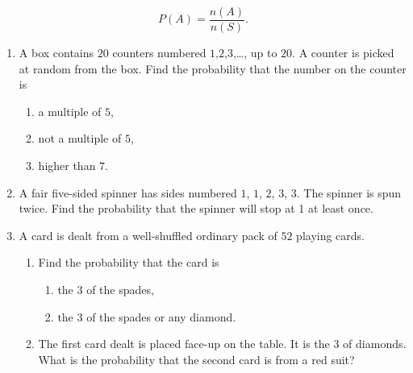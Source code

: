 \[
P(A) = \frac{n(A)}{n(S)}.
\]


\exercise  %


\begin{enumerate}
	\item A box contains $20$ counters numbered $1$,$2$,$3$,\ldots, up to $20$. A counter is picked at random from the box. Find the probability that the number on the counter is 
	\begin{enumerate}
		\item  a multiple of $5$,
		\item not a multiple of $5$,
		\item higher than $7$.
	\end{enumerate}



\item   A fair five-sided spinner has sides numbered $1$, $1$, $2$, $3$, $3$. The spinner is spun twice. Find the probability  that the spinner will stop at 1 at  least once.

\medskip

\begin{figure*}[!htpb]
\raggedleft
{}

\end{figure*}


\item  A card is dealt from a well-shuffled ordinary pack of $52$ playing cards.
\begin{enumerate}
	\item Find the probability that the card is 
	\begin{enumerate}
		\item the $3$ of the spades,
		\item the $3$ of the spades or any diamond.
	\end{enumerate}
\item The first card dealt is placed face-up on the table. It is the $3$ of diamonds. What is the probability that the second card is from a red suit?
\end{enumerate}



\end{enumerate}
